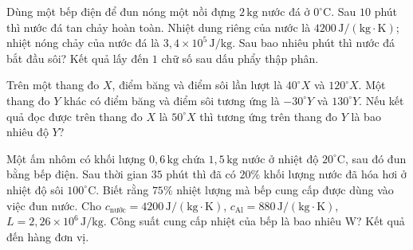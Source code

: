 \begin{ex}
	Dùng một bếp điện để đun nóng một nồi đựng $2\,\mathrm{kg}$ nước đá ở $0^\circ\mathrm{C}$. Sau $10$ phút thì nước đá tan chảy hoàn toàn. Nhiệt dung riêng của nước là $4200\,\mathrm{J/(kg\cdot K)}$; nhiệt nóng chảy của nước đá là $3{,}4\times10^5\,\mathrm{J/kg}$. Sau bao nhiêu phút thì nước đá bắt đầu sôi? Kết quả lấy đến $1$ chữ số sau dấu phẩy thập phân.
\end{ex}

\begin{ex}
	Trên một thang đo $X$, điểm băng và điểm sôi lần lượt là $40^\circ X$ và $120^\circ X$. Một thang đo $Y$ khác có điểm băng và điểm sôi tương ứng là $-30^\circ Y$ và $130^\circ Y$. Nếu kết quả đọc được trên thang đo $X$ là $50^\circ X$ thì tương ứng trên thang đo $Y$ là bao nhiêu độ $Y$?
\end{ex}

\begin{ex}
	Một ấm nhôm có khối lượng $0{,}6\,\mathrm{kg}$ chứa $1{,}5\,\mathrm{kg}$ nước ở nhiệt độ $20^\circ\mathrm{C}$, sau đó đun bằng bếp điện. Sau thời gian $35$ phút thì đã có $20\%$ khối lượng nước đã hóa hơi ở nhiệt độ sôi $100^\circ\mathrm{C}$. Biết rằng $75\%$ nhiệt lượng mà bếp cung cấp được dùng vào việc đun nước. Cho $c_{\mathrm{nước}}=4200\,\mathrm{J/(kg\cdot K)}$, $c_{\mathrm{Al}}=880\,\mathrm{J/(kg\cdot K)}$, $L=2{,}26\times10^6\,\mathrm{J/kg}$. Công suất cung cấp nhiệt của bếp là bao nhiêu W? Kết quả đến hàng đơn vị.
\end{ex}
